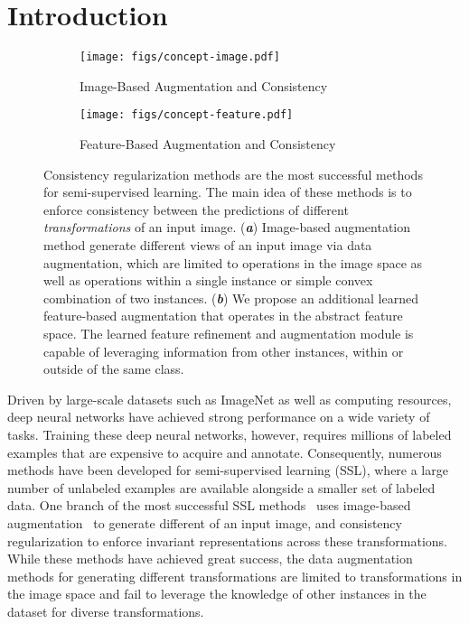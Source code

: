 \documentclass[runningheads]{llncs}
\begin{document}
 \section{Introduction}

\begin{figure}[t]
\begin{subfigure}{\textwidth}
  \centering
  \texttt{[image: figs/concept-image.pdf]}
  \caption{Image-Based Augmentation and Consistency}
  \label{fig:concept-image}
\end{subfigure}

\begin{subfigure}{\textwidth}
  \centering
  \texttt{[image: figs/concept-feature.pdf]}
  \caption{Feature-Based Augmentation and Consistency}
  \label{fig:concept-feature}
\end{subfigure}
\caption{
Consistency regularization methods are the most successful methods for semi-supervised learning.
The main idea of these methods is to enforce consistency between the predictions of different \textit{transformations} of an input image.
(\textit{\textbf{a}}) Image-based augmentation method generate different views of an input image via data augmentation, which are limited to operations in the image space as well as operations within a single instance or simple convex combination of two instances.
(\textit{\textbf{b}})
We propose an additional learned feature-based augmentation that operates in the abstract feature space.
The learned feature refinement and augmentation module is capable of leveraging information from other instances, within or outside of the same class.
}
\label{fig:concept}
\end{figure}


Driven by large-scale datasets such as ImageNet as well as computing resources, deep neural networks have achieved strong performance on a wide variety of tasks.
Training these deep neural networks, however, requires millions of labeled examples that are expensive to acquire and annotate.
Consequently, numerous methods have been developed for semi-supervised learning (SSL), where a large number of unlabeled examples are available alongside a smaller set of labeled data.
One branch of the most successful SSL methods~\cite{Laine2017iclr,miyato2018virtual,qiao2018deep,sajjadi2016regularization,tarvainen2017mean,berthelot2019mixmatch,berthelot2019remixmatch} uses image-based augmentation~\cite{zhang2018mixup,cubuk2019randaugment,hendrycks2020augmix,cubuk2018autoaugment} to generate different  of an input image, and consistency regularization to enforce invariant representations across these transformations.
While these methods have achieved great success, the data augmentation methods for generating different transformations are limited to transformations in the image space and fail to leverage the knowledge of other instances in the dataset for diverse transformations.
\end{document}
